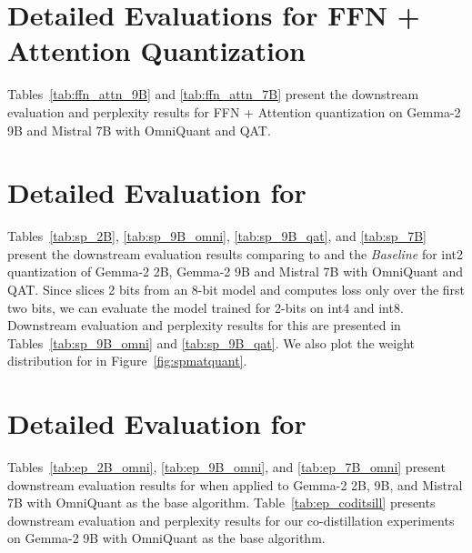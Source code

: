 \section{Detailed Evaluations for FFN + Attention Quantization}
Tables~\ref{tab:ffn_attn_9B} and \ref{tab:ffn_attn_7B} present the downstream evaluation and perplexity results for FFN + Attention quantization on Gemma-2 9B and Mistral 7B with OmniQuant and QAT.



\section{Detailed Evaluation for \spalg}
\label{app:spalg}
Tables~\ref{tab:sp_2B}, \ref{tab:sp_9B_omni}, \ref{tab:sp_9B_qat}, and \ref{tab:sp_7B} present the downstream evaluation results comparing \spalg to \alg and the \textit{Baseline} for int2 quantization of Gemma-2 2B, Gemma-2 9B and Mistral 7B with OmniQuant and QAT. Since \spalg slices 2 bits from an 8-bit model and computes loss only over the first two bits, we can evaluate the \spalg model trained for 2-bits on int4 and int8. Downstream evaluation and perplexity results for this are presented in Tables~\ref{tab:sp_9B_omni} and \ref{tab:sp_9B_qat}. We also plot the weight distribution for \spalg in Figure~\ref{fig:spmatquant}.


\section{Detailed Evaluation for \epalg}
Tables~\ref{tab:ep_2B_omni}, \ref{tab:ep_9B_omni}, and \ref{tab:ep_7B_omni} present downstream evaluation results for \epalg when applied to Gemma-2 2B, 9B, and Mistral 7B with OmniQuant as the base algorithm. Table~\ref{tab:ep_coditsill} presents downstream evaluation and perplexity results for our \epalg co-distillation experiments on Gemma-2 9B with OmniQuant as the base algorithm. 












